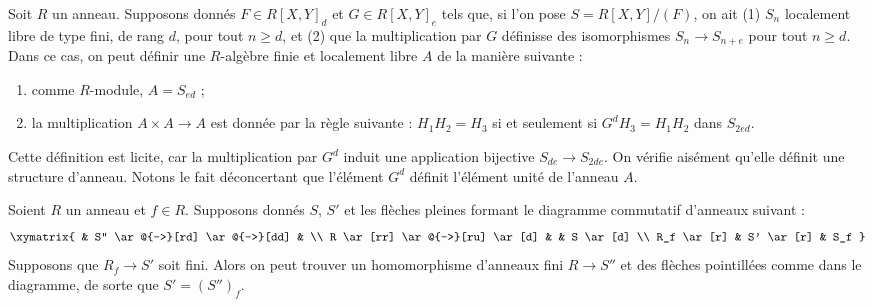 \begin{remark}
\label{remark-algebra}
Soit $R$ un anneau. Supposons donn\'es $F \in R[X, Y]_d$
et $G \in R[X, Y]_e$ tels que, si l'on pose $S = R[X, Y]/(F)$,
on ait (1) $S_n$ localement libre de type fini, de rang $d$, pour
tout $n \geq d$, et (2) que la multiplication par $G$ d\'efinisse des
isomorphismes $S_n \to S_{n + e}$ pour tout $n \geq d$. Dans ce
cas, on peut d\'efinir une $R$-alg\`ebre finie et localement libre
$A$ de la mani\`ere suivante :
\begin{enumerate}
\item comme $R$-module, $A = S_{ed}$ ;
\item la multiplication $A \times A \to A$ est donn\'ee par
la r\`egle suivante : $H_1 H_2 = H_3$ si et seulement si $G^d H_3 = H_1 H_2$
dans $S_{2ed}$.
\end{enumerate}
Cette d\'efinition est licite, car la multiplication par $G^d$
induit une application bijective $S_{de} \to S_{2de}$.
On v\'erifie ais\'ement qu'elle d\'efinit une structure d'anneau.
Notons le fait d\'econcertant que l'\'el\'ement $G^d$
d\'efinit l'\'el\'ement unit\'e de l'anneau $A$.
\end{remark}

\begin{lemma}
\label{lemma-finite-after-localization}
Soient $R$ un anneau et $f \in R$.
Supposons donn\'es $S$, $S'$ et les fl\`eches pleines
formant le diagramme commutatif d'anneaux suivant :
$$
\xymatrix{
& S'' \ar@{-->}[rd] \ar@{-->}[dd] &
\\
R \ar[rr] \ar@{-->}[ru] \ar[d] &  & S \ar[d]
\\
R_f \ar[r] & S' \ar[r] & S_f
}
$$
Supposons que $R_f \to S'$ soit fini. Alors on peut trouver
un homomorphisme d'anneaux fini $R \to S''$ et des fl\`eches pointill\'ees comme
dans le diagramme, de sorte que $S' = (S'')_f$.
\end{lemma}


